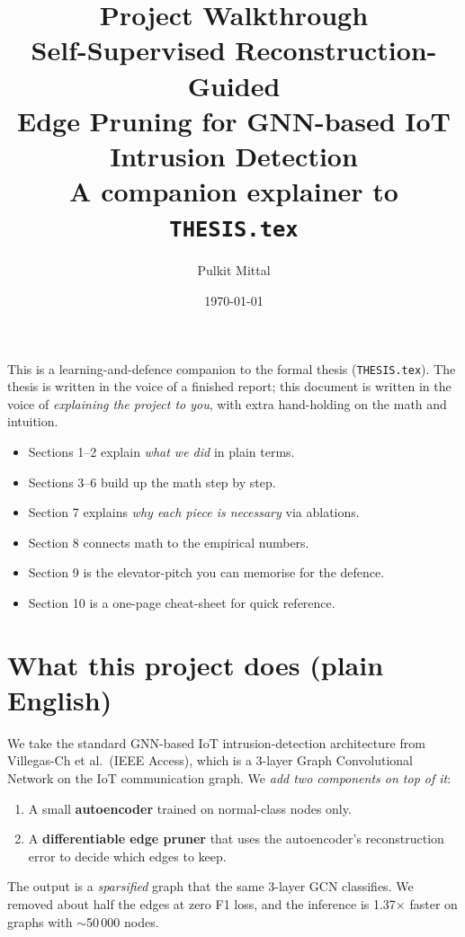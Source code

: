 \documentclass[11pt,a4paper]{article}
\title{\textbf{Project Walkthrough}\\[0.3em]
       \large Self-Supervised Reconstruction-Guided\\
       Edge Pruning for GNN-based IoT Intrusion Detection\\[0.3em]
       \normalsize A companion explainer to \texttt{THESIS.tex}}
\author{Pulkit Mittal}
\date{\today}
\begin{document}
\maketitle

\begin{keybox}
This is a learning-and-defence companion to the formal thesis
(\texttt{THESIS.tex}). The thesis is written in the voice of a finished
report; this document is written in the voice of \emph{explaining the
project to you}, with extra hand-holding on the math and intuition.
\begin{itemize}
  \item Sections 1--2 explain \emph{what we did} in plain terms.
  \item Sections 3--6 build up the math step by step.
  \item Section 7 explains \emph{why each piece is necessary} via
        ablations.
  \item Section 8 connects math to the empirical numbers.
  \item Section 9 is the elevator-pitch you can memorise for the
        defence.
  \item Section 10 is a one-page cheat-sheet for quick reference.
\end{itemize}
\end{keybox}

\tableofcontents

\section{What this project does (plain English)}

We take the standard GNN-based IoT intrusion-detection architecture
from Villegas-Ch et al.\ (IEEE Access), which is a 3-layer Graph
Convolutional Network on the IoT communication graph. We \emph{add two
components on top of it}:
\begin{enumerate}
  \item A small \textbf{autoencoder} trained on normal-class nodes
        only.
  \item A \textbf{differentiable edge pruner} that uses the
        autoencoder's reconstruction error to decide which edges to
        keep.
\end{enumerate}
The output is a \emph{sparsified} graph that the same 3-layer GCN
classifies. We removed about half the edges at zero F1 loss, and the
inference is 1.37$\times$ faster on graphs with $\sim$50\,000 nodes.
\end{document}
